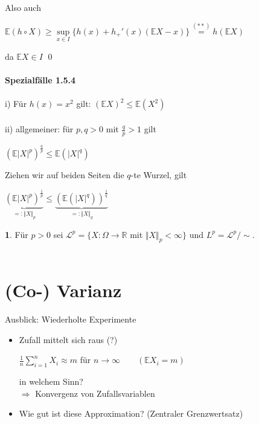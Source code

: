 \documentclass[10pt,a4paper]{report}
\numberwithin{equation}{section}
\numberwithin{figure}{section}
\theoremstyle{plain}
\theoremstyle{definition}
\newtheorem{defn}{\protect\definitionname}[section]
\theoremstyle{plain}
\theoremstyle{definition}
\theoremstyle{remark}
\theoremstyle{plain}
\theoremstyle{plain}
\theoremstyle{plain}
\theoremstyle{plain}
\theoremstyle{plain}
\providecommand{\definitionname}{Definition}
\newcommand{\1}{ \mathbb{1} } %
\begin{document}
Also auch
\begin{center}
$\mathbb{E}(h\circ X)\geq \sup\limits_{x \in I}\{h(x)+h_+'(x)(\mathbb{E}X-x)\}\overset{(**)}{=}h(\mathbb{E}X)$
\end{center}
da $\mathbb{E}X\in I$ \qed\\\\
\textbf{Spezialfälle 1.5.4}\\\\
i) Für $h(x)=x^2$ gilt: $(\mathbb{E}X)^2\leq \mathbb{E}(X^2)$\\\\
ii) allgemeiner: für $p,q>0$ mit $\frac{q}{p}>1$ gilt
\begin{center}
$(\mathbb{E}|X|^p)^\frac{q}{p} \leq \mathbb{E}(|X|^q)$
\end{center} 
Ziehen wir auf beiden Seiten die $q$-te Wurzel, gilt
\begin{center}
$\underbrace{(\mathbb{E}|X|^p)^\frac{1}{p}}_{=:\Vert X\Vert_p}\leq\underbrace{(\mathbb{E}(|X|^q))^\frac{1}{q}}_{=:\Vert X\Vert_q}$ 
\end{center}
\begin{defn}
  Für $p>0$ sei $\mathcal{L}^p=\{X:\Omega \to \mathbb{R}$ mit $\Vert X\Vert_p<\infty\}$ und $L^p=\mathcal{L}^p/\sim$.\\\\
\end{defn}

\section{(Co-) Varianz}
\label{sec:varianz}

Ausblick: Wiederholte Experimente
\begin{itemize}
\item Zufall mittelt sich raus (?)
  \begin{center}
    $\frac{1}{n}\sum\limits_{i=1}^nX_i\approx m$ für $ n\to \infty
    \qquad (\mathbb{E}X_i=m)$
  \end{center}
  in welchem Sinn?\\
  $\Rightarrow$ Konvergenz von Zufallsvariablen
\item Wie gut ist diese Approximation? (Zentraler Grenzwertsatz)
\end{itemize}
\end{document}
